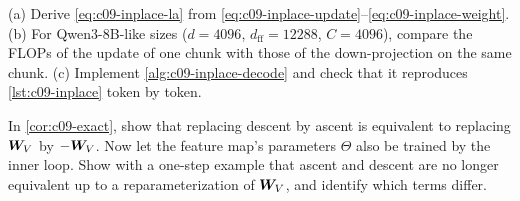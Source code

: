 \begin{exercise}
(a) Derive \eqref{eq:c09-inplace-la} from \eqref{eq:c09-inplace-update}--\eqref{eq:c09-inplace-weight}.
(b) For Qwen3-8B-like sizes ($d = 4096$, $d_{\text{ff}} = 12288$, $C = 4096$), compare the FLOPs of
the update of one chunk with those of the down-projection on the same chunk. (c) Implement
\cref{alg:c09-inplace-decode} and check that it reproduces \cref{lst:c09-inplace} token by token.
\end{exercise}

\begin{exercise}
In \cref{cor:c09-exact}, show that replacing descent by ascent is equivalent to replacing $\bm{W}_V$
by $-\bm{W}_V$. Now let the feature map's parameters $\Theta$ also be trained by the inner loop. Show
with a one-step example that ascent and descent are no longer equivalent up to a reparameterization
of $\bm{W}_V$, and identify which terms differ.
\end{exercise}
